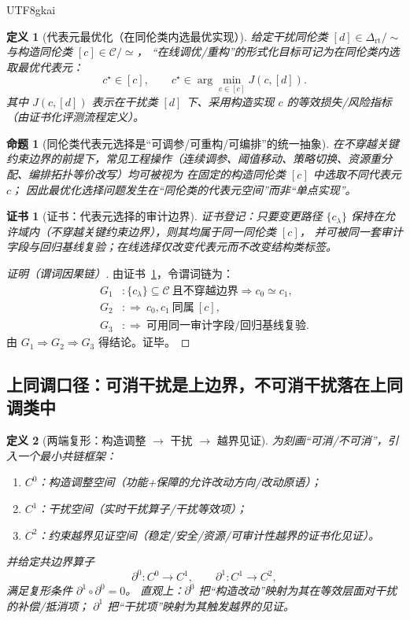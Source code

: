 \documentclass[12pt]{article}
\newtheorem{definition}{定义}[section]
\newtheorem{proposition}{命题}[section]
\newtheorem{Certificate}{证书}[section]
\newcommand{\DeltaRT}{\ensuremath{\Delta_{\mathrm{rt}}}}
\begin{document}
\begin{CJK*}{UTF8}{gkai}
\begin{definition}[代表元最优化（在同伦类内选最优实现）]
给定干扰同伦类 $[d]\in\DeltaRT/\!\sim$ 与构造同伦类 $[c]\in\mathcal{C}/\!\simeq$，
“在线调优/重构”的形式化目标可记为在同伦类内选取最优代表元：
\[
  c^\star \in [c],
  \qquad
  c^\star \in \arg\min_{c\in[c]} J(c,[d]).
\]
其中 $J(c,[d])$ 表示在干扰类 $[d]$ 下、采用构造实现 $c$ 的等效损失/风险指标（由证书化评测流程定义）。
\end{definition}

\begin{proposition}[同伦类代表元选择是“可调参/可重构/可编排”的统一抽象]
\label{prop:representative-optimization-unified-abstract}
在不穿越关键约束边界的前提下，常见工程操作（连续调参、阈值移动、策略切换、资源重分配、编排拓扑等价改写）均可被视为
在固定的构造同伦类 $[c]$ 中选取不同代表元 $c$；
因此最优化选择问题发生在“同伦类的代表元空间”而非“单点实现”。
\end{proposition}

\begin{Certificate}[证书：代表元选择的审计边界]
\label{cert:representative-optimization-audit}
证书登记：只要变更路径 $\{c_\lambda\}$ 保持在允许域内（不穿越关键约束边界），则其均属于同一同伦类 $[c]$，
并可被同一套审计字段与回归基线复验；在线选择仅改变代表元而不改变结构类标签。
\end{Certificate}

\begin{proof}[证明（谓词因果链）]
由证书~\ref{cert:representative-optimization-audit}，令谓词链为：
\[
\begin{aligned}
  G_1 &: \{c_\lambda\}\subseteq\mathcal{C}\ \text{且不穿越边界}\Rightarrow c_0\simeq c_1,\\
  G_2 &: \Rightarrow\ c_0,c_1\ \text{同属}\ [c],\\
  G_3 &: \Rightarrow\ \text{可用同一审计字段/回归基线复验}.
\end{aligned}
\]
由 $G_1\Rightarrow G_2\Rightarrow G_3$ 得结论。证毕。
\end{proof}

\subsection{上同调口径：可消干扰是上边界，不可消干扰落在上同调类中}
\label{sec:cohomology-clear-cancel-noncancel}

\begin{definition}[两端复形：构造调整 $\to$ 干扰 $\to$ 越界见证]
为刻画“可消/不可消”，引入一个最小共链框架：
\begin{enumerate}
  \item $C^0$：构造调整空间（功能+保障的允许改动方向/改动原语）；
  \item $C^1$：干扰空间（实时干扰算子/干扰等效项）；
  \item $C^2$：约束越界见证空间（稳定/安全/资源/可审计性越界的证书化见证）。
\end{enumerate}
并给定共边界算子
\[
  \partial^0:C^0\to C^1,\qquad
  \partial^1:C^1\to C^2,
\]
满足复形条件 $\partial^1\circ \partial^0 = 0$。
直观上：$\partial^0$ 把“构造改动”映射为其在等效层面对干扰的补偿/抵消项；
$\partial^1$ 把“干扰项”映射为其触发越界的见证。
\end{definition}


\end{CJK*}
\end{document}
